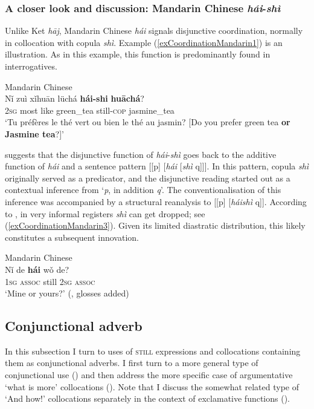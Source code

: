 {\subsubsection{A closer look and discussion: Mandarin Chinese \textit{hái}-\textit{shì}}
Unlike Ket \textit{hāj}, Mandarin Chinese \textit{hái} signals disjunctive coordination, normally in collocation with copula \textit{shì}. Example (\ref{exCoordinationMandarin1}) is an illustration. As in this example, this function is predominantly found in interrogatives.

\begin{exe}
	\ex Mandarin Chinese\label{exCoordinationMandarin1}\\
	\gll Nǐ zuì xǐhuān lüchá \textbf{hái-shi} \textbf{huāchá}?\\
	2\textsc{sg} most like green\_tea still-\textsc{cop} jasmine\_tea\\
	\glt \lq Tu préfères le thé vert ou bien le thé au jasmin? [Do you prefer green tea \textbf{or Jasmine tea}?]' \parencite[112]{Donazzan2008}
\end{exe}

\textcite{Lu2019} suggests that the disjunctive function of \textit{hái}-\textit{shì} goes back to the additive function of \textit{hái} and a sentence pattern [[p] [\textit{hái} [\textit{shì} q]]]. In this pattern, copula \textit{shì} originally served as a predicator, and the disjunctive reading started out as a contextual inference from \lq \textit{p}, in addition \textit{q}\rq{}. The conventionalisation of this inference was accompanied by a structural reanalysis to [[p] [\textit{háishì} q]]. According to \textcite[339]{Wiedenhof2015}, in very informal registers \textit{shì} can get dropped; see (\ref{exCoordinationMandarin3}). Given its limited diastratic distribution, this likely constitutes a subsequent innovation. 

\begin{exe}
	\ex Mandarin Chinese\label{exCoordinationMandarin3}\\
	\gll Nǐ de \textbf{hái} wǒ de?\\
	1\textsc{sg} \textsc{assoc} still 2\textsc{sg} \textsc{assoc}\\
	\glt \lq Mine or yours?\rq{ }(\cite[339]{Wiedenhof2015}, glosses added)
\end{exe}

\subsection{Conjunctional adverb}\label{sectionConjunctionalMain}
In this subsection I turn to uses of \textsc{still} expressions and collocations containing them as conjunctional adverbs. I first turn to a more general type of conjunctional use () and then address the more specific case of argumentative \lq what is more\rq{ }collocations (). Note that I discuss the somewhat related type of \lq And how!\rq{ }collocations separately in the context of exclamative functions ().

}
